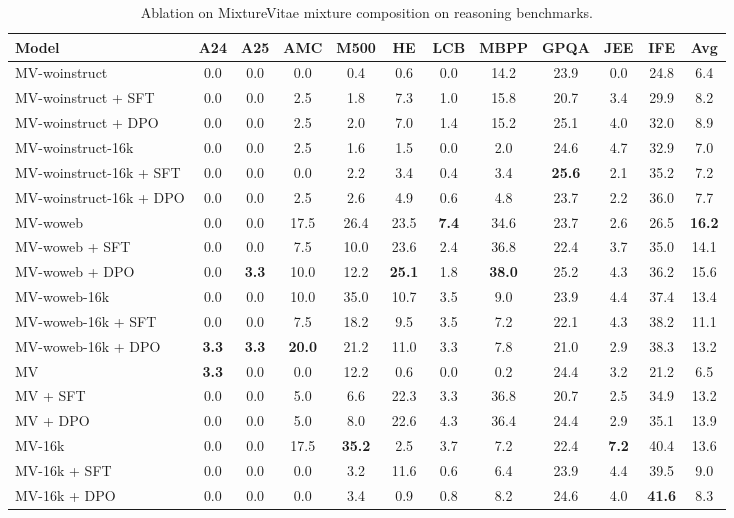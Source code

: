 \begin{table}[ht]
\centering
\caption{Ablation on MixtureVitae mixture composition on reasoning benchmarks.}
\label{tab:evalchemy_table1}
\scriptsize
\begin{tabular}{lccccccccccc}
\toprule
\textbf{Model} & \textbf{A24} & \textbf{A25} & \textbf{AMC} & \textbf{M500} & \textbf{HE} & \textbf{LCB} & \textbf{MBPP} & \textbf{GPQA} & \textbf{JEE} & \textbf{IFE} & \textbf{Avg} \\
\midrule
MV-woinstruct & 0.0 & 0.0 & 0.0 & 0.4 & 0.6 & 0.0 & 14.2 & 23.9 & 0.0 & 24.8 & 6.4 \\
MV-woinstruct + SFT & 0.0 & 0.0 & 2.5 & 1.8 & 7.3 & 1.0 & 15.8 & 20.7 & 3.4 & 29.9 & 8.2 \\
MV-woinstruct + DPO & 0.0 & 0.0 & 2.5 & 2.0 & 7.0 & 1.4 & 15.2 & 25.1 & 4.0 & 32.0 & 8.9 \\
\midrule
\addlinespace[0.3em]
MV-woinstruct-16k & 0.0 & 0.0 & 2.5 & 1.6 & 1.5 & 0.0 & 2.0 & 24.6 & 4.7 & 32.9 & 7.0 \\
MV-woinstruct-16k + SFT & 0.0 & 0.0 & 0.0 & 2.2 & 3.4 & 0.4 & 3.4 & \textbf{25.6} & 2.1 & 35.2 & 7.2 \\
MV-woinstruct-16k + DPO & 0.0 & 0.0 & 2.5 & 2.6 & 4.9 & 0.6 & 4.8 & 23.7 & 2.2 & 36.0 & 7.7 \\
\midrule
\addlinespace[0.3em]
MV-woweb & 0.0 & 0.0 & 17.5 & 26.4 & 23.5 & \textbf{7.4} & 34.6 & 23.7 & 2.6 & 26.5 & \textbf{16.2} \\
MV-woweb + SFT & 0.0 & 0.0 & 7.5 & 10.0 & 23.6 & 2.4 & 36.8 & 22.4 & 3.7 & 35.0 & 14.1 \\
MV-woweb + DPO & 0.0 & \textbf{3.3} & 10.0 & 12.2 & \textbf{25.1} & 1.8 & \textbf{38.0} & 25.2 & 4.3 & 36.2 & 15.6 \\
\midrule
\addlinespace[0.3em]
MV-woweb-16k & 0.0 & 0.0 & 10.0 & 35.0 & 10.7 & 3.5 & 9.0 & 23.9 & 4.4 & 37.4 & 13.4 \\
MV-woweb-16k + SFT & 0.0 & 0.0 & 7.5 & 18.2 & 9.5 & 3.5 & 7.2 & 22.1 & 4.3 & 38.2 & 11.1 \\
MV-woweb-16k + DPO & \textbf{3.3} & \textbf{3.3} & \textbf{20.0} & 21.2 & 11.0 & 3.3 & 7.8 & 21.0 & 2.9 & 38.3 & 13.2 \\
\midrule
\addlinespace[0.3em]
MV & \textbf{3.3} & 0.0 & 0.0 & 12.2 & 0.6 & 0.0 & 0.2 & 24.4 & 3.2 & 21.2 & 6.5 \\
MV + SFT & 0.0 & 0.0 & 5.0 & 6.6 & 22.3 & 3.3 & 36.8 & 20.7 & 2.5 & 34.9 & 13.2 \\
MV + DPO & 0.0 & 0.0 & 5.0 & 8.0 & 22.6 & 4.3 & 36.4 & 24.4 & 2.9 & 35.1 & 13.9 \\
\midrule
\addlinespace[0.3em]
MV-16k & 0.0 & 0.0 & 17.5 & \textbf{35.2} & 2.5 & 3.7 & 7.2 & 22.4 & \textbf{7.2} & 40.4 & 13.6 \\
MV-16k + SFT & 0.0 & 0.0 & 0.0 & 3.2 & 11.6 & 0.6 & 6.4 & 23.9 & 4.4 & 39.5 & 9.0 \\
MV-16k + DPO & 0.0 & 0.0 & 0.0 & 3.4 & 0.9 & 0.8 & 8.2 & 24.6 & 4.0 & \textbf{41.6} & 8.3 \\
\bottomrule
\end{tabular}
\end{table}


